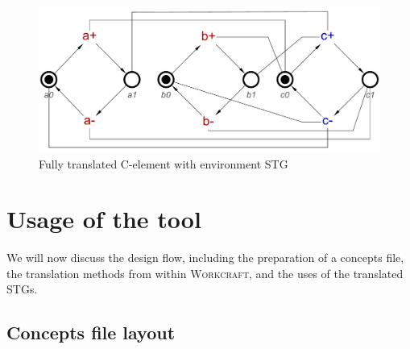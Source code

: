 \documentclass[british,conference,compsoc]{IEEEtran}
\newcommand{\noun}[1]{\textsc{#1}}
\begin{document}
\begin{figure}[H]
\vspace{-4mm}
\begin{centering}
\includegraphics[scale=0.3]{Images/cElement-stg-translated}
\par\end{centering}
\protect\caption{\label{fig:cElement-stg-translated} Fully translated C-element with environment STG}
\vspace{-4mm}
\end{figure}


\section{Usage of the tool\label{sec:tool-use}}

\vspace{-3mm}

We will now discuss the design flow, including the preparation of 
a concepts file, the translation methods from within \noun{Workcraft}, and 
the uses of the translated STGs.

\vspace{-3mm}

\subsection{Concepts file layout \label{sub:file_layout}}

\vspace{-4mm}
\end{document}
